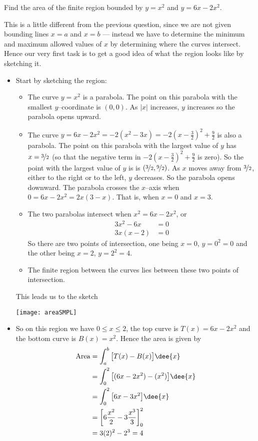 \begin{eg}\label{eg:AREAa}
Find the area of the finite region bounded by $y=x^2$ and
$y=6x-2x^2$.

\soln This is a little different from the previous question, since we are not given
bounding lines $x=a$ and $x=b$ --- instead we have to determine the minimum and maximum
allowed values of $x$ by determining where the curves intersect. Hence our very first
task is to get a good idea of what the region looks like by sketching it.
\begin{itemize}
\item Start by sketching the region:
\begin{itemize}
\item The curve $y=x^2$ is a parabola. The point on this parabola with the
smallest $y$--coordinate is $(0,0)$. As $|x|$ increases, $y$ increases
so the parabola opens upward.

\item The curve $y=6x-2x^2 =-2(x^2-3x) =-2(x-\frac{3}{2})^2+\frac{9}{2}$ is also a
parabola. The point on this parabola with the largest value of $y$ has
$x=\nicefrac{3}{2}$
(so that the negative term in $-2(x-\frac{3}{2})^2+\frac{9}{2}$ is zero). So the point
with the largest value of $y$ is is $(\nicefrac{3}{2},\nicefrac{9}{2})$. As $x$ moves
away
from $\nicefrac{3}{2}$, either to the right or to the left, $y$ decreases. So the
parabola
opens downward. The parabola crosses the $x$--axis when $0=6x-2x^2=2x(3-x)$. That is,
when
$x=0$ and $x=3$.

\item The two parabolas intersect when $x^2= 6x-2x^2$, or
   \begin{align*}
      3x^2-6x&=0 \\
      3x(x-2)&=0
    \end{align*}
So there are two points of intersection, one being $x=0$, $y=0^2=0$
and the other being $x=2$, $y=2^2=4$.
\item The finite region between the curves lies between these two points of
intersection.
\end{itemize}
This leads us to the sketch
\begin{efig}
\begin{center}
   \texttt{[image: areaSMPL]}
\end{center}
\end{efig}
\item So on this region we have $0\leq x\leq 2$, the top curve is $T(x)=6x-2x^2$ and the
bottom curve is $B(x)=x^2$. Hence the area is given by
\begin{align*}
  \text{Area} &=\int_a^b \big[T(x)-B(x)\big]\dee{x} \\
&=\int_0^2\big[(6x-2x^2)-(x^2)\big]\dee{x}\\
&=\int_0^2\big[6x-3x^2\big]\dee{x} \\
&=\bigg[6\frac{x^2}{2}-3\frac{x^3}{3}\bigg]_0^2\\
&=3(2)^2-2^3 =4
\end{align*}


\end{itemize}

\end{eg}


